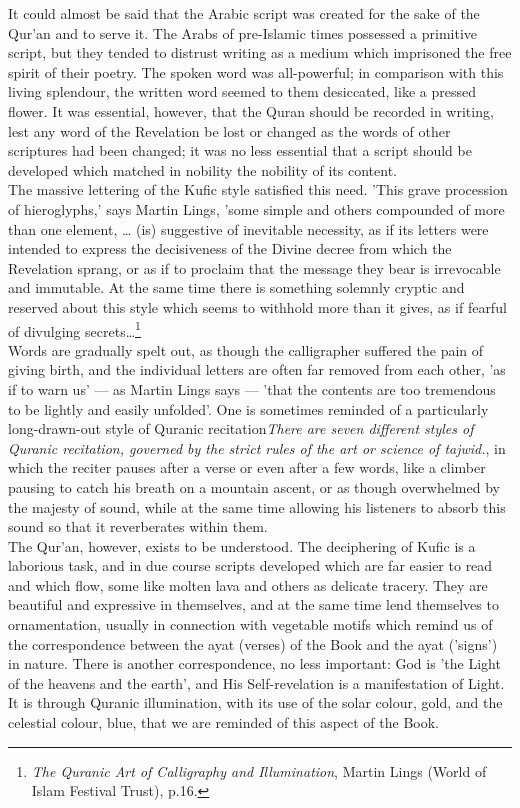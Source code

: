 \documentclass[11pt, b5paper, twoside]{book}
\begin{document}
It could almost be said that the Arabic script was created for the sake of the Qur'an and to serve 
it. The Arabs of pre-Islamic times possessed a primitive script, but they tended to distrust writing 
as a medium which imprisoned the free spirit of their poetry. The spoken word was all-powerful; in 
comparison with this living splendour, the written word seemed to them desiccated, like a pressed 
flower. It was essential, however, that the Quran should be recorded in writing, lest any word of the 
Revelation be lost or changed as the words of other scriptures had been changed; it was no less 
essential that a script should be developed which matched in nobility the nobility of its content. \\

The massive lettering of the Kufic style satisfied this need. 'This grave procession of hieroglyphs,' 
says Martin Lings, 'some simple and others compounded of more than one element, \ldots{} (is) suggestive 
of inevitable necessity, as if its letters were intended to express the decisiveness of the Divine 
decree from which the Revelation sprang, or as if to proclaim that the message they bear is 
irrevocable and immutable. At the same time there is something solemnly cryptic and reserved about 
this style which seems to withhold more than it gives, as if fearful of divulging secrets\ldots{}\footnote{\emph{The Quranic Art of Calligraphy and Illumination}, Martin Lings (World of Islam Festival Trust), p.16.}\\

Words are gradually spelt out, as though the calligrapher suffered the pain of giving birth, and the 
individual letters are often far removed from each other, 'as if to warn us' --- as Martin Lings says --- 
'that the contents are too tremendous to be lightly and easily unfolded'. One is sometimes reminded 
of a particularly long-drawn-out style of Quranic recitation\emph{There are seven different styles of Quranic recitation, governed by the strict rules of the art or 
science of tajwid.}, in which the reciter pauses after a 
verse or even after a few words, like a climber pausing to catch his breath on a mountain ascent, or 
as though overwhelmed by the majesty of sound, while at the same time allowing his listeners to 
absorb this sound so that it reverberates within them.\\ 

The Qur'an, however, exists to be understood. The deciphering of Kufic is a laborious task, and in 
due course scripts developed which are far easier to read and which flow, some like molten lava and 
others as delicate tracery. They are beautiful and expressive in themselves, and at the same time 
lend themselves to ornamentation, usually in connection with vegetable motifs which remind us of the 
correspondence between the ayat (verses) of the Book and the ayat ('signs') in nature. There is 
another correspondence, no less important: God is 'the Light of the heavens and the earth', and His 
Self-revelation is a manifestation of Light. It is through Quranic illumination, with its use of the 
solar colour, gold, and the celestial colour, blue, that we are reminded of this aspect of the Book. \\
\end{document}
